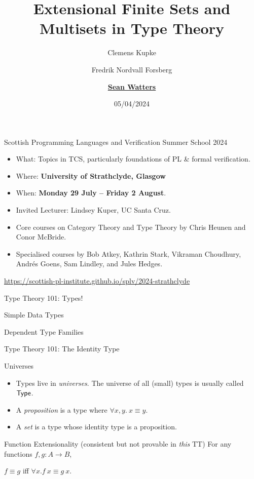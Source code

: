 \documentclass{beamer}
\title[Extenensional Fin. Sets \& Multisets in TT]{Extensional Finite Sets and Multisets in Type Theory}
\author[S. Watters]{Clemens Kupke \and Fredrik Nordvall Forsberg \and \underline{\textbf{Sean Watters}}}
\institute{University of Strathclyde}
\date{05/04/2024}
\begin{document}
\begin{frame}
  \titlepage{}
\end{frame}


\begin{frame}{Scottish Programming Languages and Verification Summer School 2024}
\begin{itemize}
  \item What: Topics in TCS, particularly foundations of PL \& formal verification.
  \item Where: \textbf{University of Strathclyde, Glasgow}
  \item When: \textbf{Monday 29 July -- Friday 2 August}.

  \pause

  \item Invited Lecturer: Lindsey Kuper, UC Santa Cruz.
  \item Core courses on Category Theory and Type Theory by Chris Heunen and Conor McBride.
  \item Specialised courses by Bob Atkey, Kathrin Stark, Vikraman Choudhury, Andr\'{e}s Goens, Sam Lindley, and Jules Hedges.
\end{itemize}

\begin{center}
  \url{https://scottish-pl-institute.github.io/splv/2024-strathclyde}
\end{center}
\end{frame}


\begin{frame}{Type Theory 101: Types!}
  \begin{block}{Simple Data Types}
  \snippetdatalist{}
  \end{block}
\pause
  \begin{block}{Dependent Type Families}
  \snippetmember{}
  \end{block}
\end{frame}

\begin{frame}{Type Theory 101: The Identity Type}
  \snippetidentity{}
  \pause
  \begin{block}{Universes}
    \begin{itemize}
    \item Types live in \emph{universes}. The universe of all (small) types is usually called $\AgdaDatatype{Type}$.
    \pause
    \item A \emph{proposition} is a type where $\forall x,y.~x \equiv y$.
    \pause
    \item A \emph{set} is a type whose identity type is a proposition.
    \end{itemize}
  \end{block}

  \pause
  \begin{block}{Function Extensionality (consistent but not provable in \emph{this} TT)}
    For any functions $f, g : A \to B$,
    \begin{center}
    $f \equiv g$ iff $\forall x. f~x \equiv g~x$.
    \end{center}
  \end{block}
\end{frame}
\end{document}
